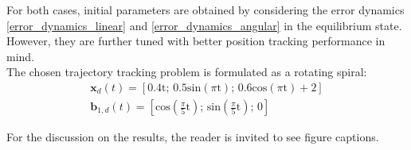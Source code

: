 For both cases, initial parameters are obtained by considering the error dynamics \eqref{error_dynamics_linear} and \eqref{error_dynamics_angular} in the equilibrium state. However, they are further tuned with better position tracking performance in mind.\\
\noindent The chosen trajectory tracking problem is formulated as a rotating spiral:
\begin{gather*}
	\textbf{x}_d(t) = [0.4\text{t}; \, 0.5\text{sin}(\pi\text{t}); \, 0.6\text{cos}(\pi\text{t}) + 2] \\
	\textbf{b}_{1,d}(t) = [\text{cos}\left(\frac{\pi}{5}\text{t}\right); \, \text{sin}\left(\frac{\pi}{5}\text{t}\right); \, 0]
\end{gather*}

For the discussion on the results, the reader is invited to see figure captions. 

